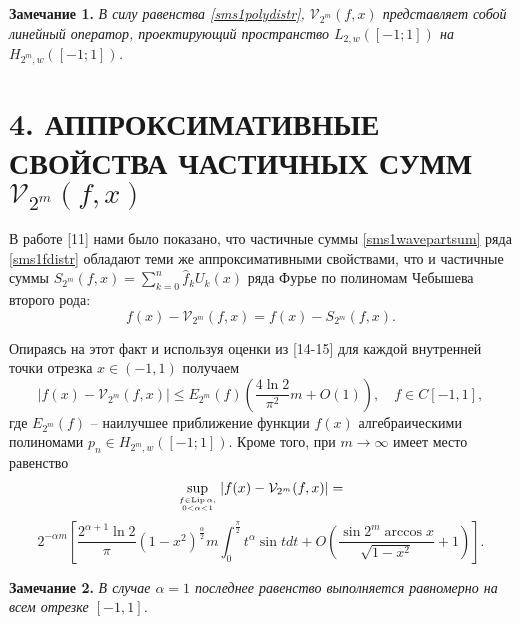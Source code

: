 \documentclass[12pt]{book}
\begin{document}
\noindent\textbf{Замечание 1. }\textit{
В силу равенства \eqref{sms1polydistr}, $\mathcal{V}_{2^m}(f, x)$ представляет собой линейный оператор, проектирующий пространство $L_{2, w}([-1; 1])$ на $H_{2^m, w}([-1; 1])$.
}



\section*{4. АППРОКСИМАТИВНЫЕ СВОЙСТВА ЧАСТИЧНЫХ СУММ $\mathcal{V}_{2^m}(f,x)$}

В работе [11]
нами было показано, что частичные суммы \eqref{sms1wavepartsum} ряда \eqref{sms1fdistr} обладают теми же аппроксимативными свойствами, что и частичные суммы $S_{2^{m}}(f,x) = \sum_{k=0}^{n} \hat{f}_k U_k(x)$ ряда Фурье по полиномам Чебышева второго рода:
\begin{equation}
\label{sms1approxprops}
f(x) - \mathcal{V}_{2^m}(f,x) = f(x) - S_{2^{m}}(f,x).
\end{equation}

Опираясь на этот факт и используя оценки из [14-15]
для каждой внутренней точки отрезка $x \in (-1, 1)$ получаем
\begin{equation}
\label{sms1v2mforC}
\left| f(x) - \mathcal{V}_{2^m}(f, x) \right| \leq
E_{2^{m}}(f) \left(\frac{4 \ln{2}}{\pi^2}m + O(1)\right),  \quad f \in C[-1,1],
\end{equation}
где $E_{2^m}(f)$ -- наилучшее приближение функции $f(x)$ алгебраическими полиномами $p_n\in H_{2^{m}, w}([-1; 1])$. Кроме того, при $m \rightarrow \infty$ имеет  место равенство %
\begin{equation*}
\sup_{f \in \operatorname{Lip}{\alpha}, \atop 0 < \alpha < 1} \left| f(x) - \mathcal{V}_{2^m}(f,x) \right| =
\end{equation*}
\begin{equation}
\label{sms1lipshitz}
2^{-\alpha m} \left[
\frac{2^{\alpha+1}\ln{2}}{\pi} \left( 1-x^2 \right)^{\frac{\alpha}{2}}m
\int_{0}^{\frac{\pi}{2}} t^{\alpha} \sin{t} dt +
O \left( \frac{\sin{2^{m} \arccos {x}}}{\sqrt{1-x^2}} + 1\right)
\right].
\end{equation}

\noindent\textbf{Замечание 2. }\textit{
В случае $\alpha = 1$ последнее равенство выполняется равномерно на всем отрезке $[-1, 1]$.
}


\end{document}
